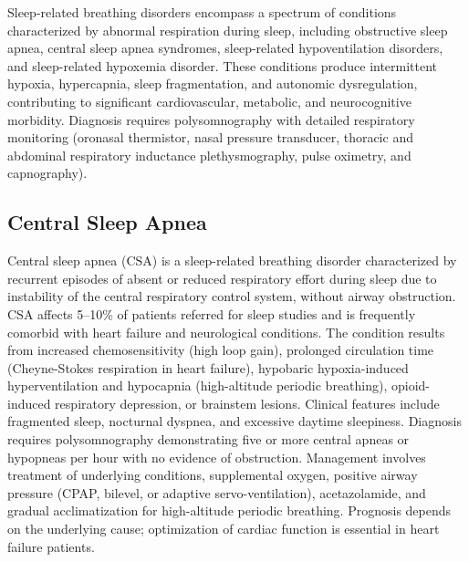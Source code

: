


\label{sec:Sleep-Related Breathing Disorders}

Sleep-related breathing disorders encompass a spectrum of conditions characterized by abnormal respiration during sleep, including obstructive sleep apnea, central sleep apnea syndromes, sleep-related hypoventilation disorders, and sleep-related hypoxemia disorder. These conditions produce intermittent hypoxia, hypercapnia, sleep fragmentation, and autonomic dysregulation, contributing to significant cardiovascular, metabolic, and neurocognitive morbidity. Diagnosis requires polysomnography with detailed respiratory monitoring (oronasal thermistor, nasal pressure transducer, thoracic and abdominal respiratory inductance plethysmography, pulse oximetry, and capnography).

\subsection{Central Sleep Apnea}
\label{sec:Central Sleep Apnea}
Central sleep apnea (CSA) is a sleep-related breathing disorder characterized by recurrent episodes of absent or reduced respiratory effort during sleep due to instability of the central respiratory control system, without airway obstruction. CSA affects 5--10\% of patients referred for sleep studies and is frequently comorbid with heart failure and neurological conditions. The condition results from increased chemosensitivity (high loop gain), prolonged circulation time (Cheyne-Stokes respiration in heart failure), hypobaric hypoxia-induced hyperventilation and hypocapnia (high-altitude periodic breathing), opioid-induced respiratory depression, or brainstem lesions. Clinical features include fragmented sleep, nocturnal dyspnea, and excessive daytime sleepiness. Diagnosis requires polysomnography demonstrating five or more central apneas or hypopneas per hour with no evidence of obstruction. Management involves treatment of underlying conditions, supplemental oxygen, positive airway pressure (CPAP, bilevel, or adaptive servo-ventilation), acetazolamide, and gradual acclimatization for high-altitude periodic breathing. Prognosis depends on the underlying cause; optimization of cardiac function is essential in heart failure patients.

